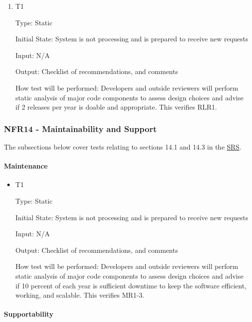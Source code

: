 \documentclass[12pt, titlepage]{article}
\begin{document}
\begin{enumerate}

\item{T1\\}
\hypertarget{NFR13.5-TC1}{}
  
Type: Static

Initial State: System is not processing and is prepared to receive new requests

Input: N/A

Output: Checklist of recommendations, and comments

How test will be performed: Developers and outside reviewers will perform static analysis of major code components to assess design choices and advise if 2 releases per year is doable and appropriate. This verifies RLR1.

\end{enumerate}

\hypertarget{nfr14}{}
\subsubsection{NFR14 - Maintainability and Support}

The subsections below cover tests relating to sections 14.1 and 14.3 in the \href{https://shorturl.at/FdAgR}{SRS}.

\paragraph{Maintenance}

\begin{itemize}

\item{T1\\}
\hypertarget{NFR14.1-TC1}{}

Type: Static

Initial State: System is not processing and is prepared to receive new requests

Input: N/A

Output: Checklist of recommendations, and comments

How test will be performed: Developers and outside reviewers will perform static analysis of major code components to assess design choices and advise if 10 percent of each year is sufficient downtime to keep the software efficient, working, and scalable. This verifies MR1-3.

\end{itemize}

\paragraph{Supportability}
\end{document}
